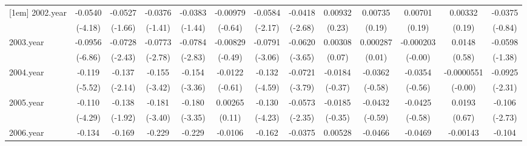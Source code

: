 {\begin{tabular}{l*{12}{c}}
[1em]
2002.year   &     -0.0540\sym{***}&     -0.0527         &     -0.0376         &     -0.0383         &    -0.00979         &     -0.0584\sym{*}  &     -0.0418\sym{**} &     0.00932         &     0.00735         &     0.00701         &     0.00332         &     -0.0375         \\
            &     (-4.18)         &     (-1.66)         &     (-1.41)         &     (-1.44)         &     (-0.64)         &     (-2.17)         &     (-2.68)         &      (0.23)         &      (0.19)         &      (0.19)         &      (0.19)         &     (-0.84)         \\
[1em]
2003.year   &     -0.0956\sym{***}&     -0.0728\sym{*}  &     -0.0773\sym{**} &     -0.0784\sym{**} &    -0.00829         &     -0.0791\sym{**} &     -0.0620\sym{***}&     0.00308         &    0.000287         &   -0.000203         &      0.0148         &     -0.0598         \\
            &     (-6.86)         &     (-2.43)         &     (-2.78)         &     (-2.83)         &     (-0.49)         &     (-3.06)         &     (-3.65)         &      (0.07)         &      (0.01)         &     (-0.00)         &      (0.58)         &     (-1.38)         \\
[1em]
2004.year   &      -0.119\sym{***}&      -0.137\sym{*}  &      -0.155\sym{**} &      -0.154\sym{**} &     -0.0122         &      -0.132\sym{***}&     -0.0721\sym{***}&     -0.0184         &     -0.0362         &     -0.0354         &  -0.0000551         &     -0.0925\sym{*}  \\
            &     (-5.52)         &     (-2.14)         &     (-3.42)         &     (-3.36)         &     (-0.61)         &     (-4.59)         &     (-3.79)         &     (-0.37)         &     (-0.58)         &     (-0.56)         &     (-0.00)         &     (-2.31)         \\
[1em]
2005.year   &      -0.110\sym{***}&      -0.138         &      -0.181\sym{**} &      -0.180\sym{**} &     0.00265         &      -0.130\sym{***}&     -0.0573\sym{*}  &     -0.0185         &     -0.0432         &     -0.0425         &      0.0193         &      -0.106\sym{**} \\
            &     (-4.29)         &     (-1.92)         &     (-3.40)         &     (-3.35)         &      (0.11)         &     (-4.23)         &     (-2.35)         &     (-0.35)         &     (-0.59)         &     (-0.58)         &      (0.67)         &     (-2.73)         \\
[1em]
2006.year   &      -0.134\sym{***}&      -0.169         &      -0.229\sym{**} &      -0.229\sym{**} &     -0.0106         &      -0.162\sym{***}&     -0.0375         &     0.00528         &     -0.0466         &     -0.0469         &    -0.00143         &      -0.104         \\

\end{tabular}}

